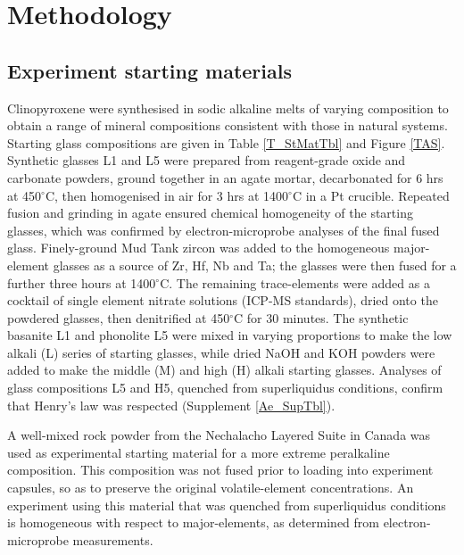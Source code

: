 \documentclass[review,authoryear,12pt]{elsarticle}
\newcommand{\dgC}{$^\circ$C }
\newcommand{\dgCs}{$^\circ$C}
\begin{document}

\section{Methodology}

\subsection{Experiment starting materials}
Clinopyroxene were synthesised in sodic alkaline melts of varying composition to obtain a range of mineral compositions consistent with those in natural systems. Starting glass compositions are given in Table \ref{T_StMatTbl} and Figure \ref{TAS}. Synthetic glasses L1 and L5 were prepared from reagent-grade oxide and carbonate powders, ground together in an agate mortar, decarbonated for 6 hrs at 450\dgCs, then homogenised in air for 3 hrs at 1400\dgC in a Pt crucible. Repeated fusion and grinding in agate ensured chemical homogeneity of the starting glasses, which was confirmed by electron-microprobe analyses of the final fused glass. Finely-ground Mud Tank zircon was added to the homogeneous major-element glasses as a source of Zr, Hf, Nb and Ta; the glasses were then fused for a further three hours at 1400\dgCs. The remaining trace-elements were added as a cocktail of single element nitrate solutions (ICP-MS standards), dried onto the powdered glasses, then denitrified at 450\dgC for 30 minutes. The synthetic basanite L1 and phonolite L5 were mixed in varying proportions to make the low alkali (L) series of starting glasses, while dried NaOH and KOH powders were added to make the middle (M) and high (H) alkali starting glasses. Analyses of glass compositions L5 and H5, quenched from superliquidus conditions, confirm that Henry's law was respected (Supplement \ref{Ae_SupTbl}).

A well-mixed rock powder from the Nechalacho Layered Suite in Canada \citep[][Unit NLS-9, sample L09-194-405.5, alternative sample name \emph{VM 11-6}]{Moller2016} was used as experimental starting material for a more extreme peralkaline composition. This composition was not fused prior to loading into experiment capsules, so as to preserve the original volatile-element concentrations. An experiment using this material that was quenched from superliquidus conditions is homogeneous with respect to major-elements, as determined from electron-microprobe measurements.
\end{document}
